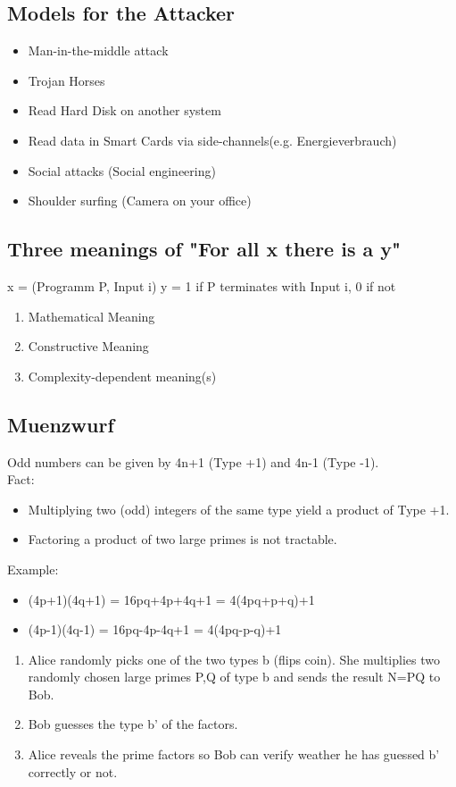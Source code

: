 \documentclass[a4paper, 12pt]{article}
\begin{document}
\subsection{Models for the Attacker}
\begin{itemize}
	\item Man-in-the-middle attack
	\item Trojan Horses
	\item Read Hard Disk on another system
	\item Read data in Smart Cards via side-channels(e.g. Energieverbrauch)
	\item Social attacks (Social engineering)
	\item Shoulder surfing (Camera on your office)
\end{itemize}
\subsection{Three meanings of "For all x there is a y"}
	x = (Programm P, Input i) \newline
	y = 1 if P terminates with Input i, 0 if not
\begin{enumerate}
	\item Mathematical Meaning
	\item Constructive Meaning
	\item Complexity-dependent meaning(s)
\end{enumerate}
\subsection{Muenzwurf}
Odd numbers can be given by 4n+1 (Type +1) and 4n-1 (Type -1).\\
Fact:
\begin{itemize}
\item Multiplying two (odd) integers of the same type yield a product of Type +1.
\item Factoring a product of two large primes is not tractable.
\end{itemize}
Example:
\begin{itemize}
\item (4p+1)(4q+1) = 16pq+4p+4q+1 = 4(4pq+p+q)+1
\item (4p-1)(4q-1) = 16pq-4p-4q+1 = 4(4pq-p-q)+1
\end{itemize}
\begin{enumerate}
\item Alice randomly picks one of the two types b (flips coin). She multiplies two randomly chosen large primes P,Q of type b and sends the result N=PQ to Bob.\\
\item Bob guesses the type b' of the factors.\\
\item Alice reveals the prime factors so Bob can verify weather he has guessed b' correctly or not.
\end{enumerate}
\end{document}
